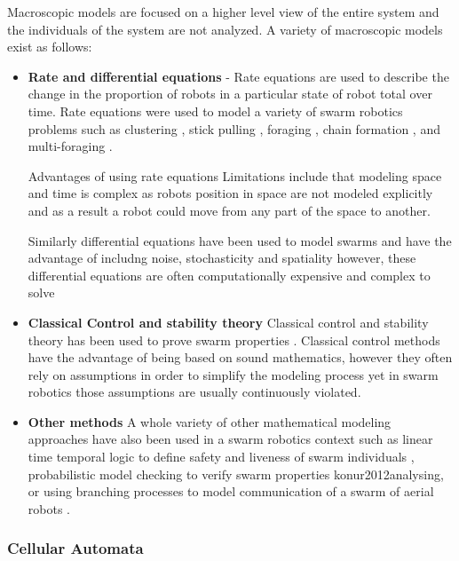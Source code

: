 Macroscopic models are focused on a higher level view of the entire system and the individuals of the system are not analyzed.  A variety of macroscopic models exist as follows: 
\begin{itemize}
	\item \textbf{Rate and differential equations} - Rate equations are used to describe the change in the proportion of robots in a particular state of robot total over time. Rate equations were used to model a variety of swarm robotics problems such as  clustering \cite{martinoli1999understanding}, stick pulling \cite{lerman2001macroscopic}, foraging \cite{lerman2002mathematical}, chain formation \cite{trianni2002modeling}, and multi-foraging \cite{campo2007efficient}. 
	
Advantages of using rate equations 	
Limitations include that modeling space and time is complex as robots position in space are not modeled explicitly and as a result a robot could move from any part of the space to another.

Similarly differential equations have been used to model swarms and have the advantage of includng noise, stochasticity and spatiality however, these differential equations are often computationally expensive and complex to solve \cite{hamann2008framework, prorok2011multi}


	\item \textbf{Classical Control and stability theory} Classical control and stability theory has been used to prove swarm properties \cite{gazi2005stability,liu2004stable, schwager2011time}. Classical control methods have the advantage of being based on sound mathematics, however they often rely on assumptions in order to simplify the modeling process  yet in swarm robotics those assumptions are usually continuously violated.

	\item \textbf{Other methods}
	A whole variety of other mathematical modeling approaches have also been used in a swarm robotics context such as linear time temporal logic to define safety and liveness of swarm individuals \cite{winfield2005formal}, probabilistic model checking to verify swarm properties {konur2012analysing}, or using branching processes to model communication of a swarm of aerial robots \cite{mathews2010establishing}. 
\end{itemize}

\subsubsection{Cellular Automata}
